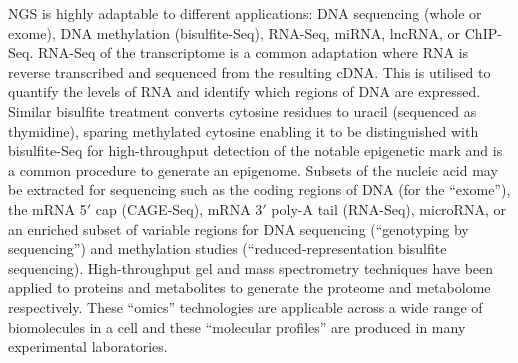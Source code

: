 
\gls{NGS} is highly adaptable to different applications: DNA sequencing (whole  or \gls{exome}), DNA methylation (\gls{bisulfite-Seq}), \gls{RNA-Seq}, \gls{miRNA}, \gls{lncRNA}, or \gls{ChIP-Seq}. \gls{RNA-Seq} of the \gls{transcriptome} is a common adaptation where \gls{RNA} is reverse transcribed and sequenced from the resulting \gls{cDNA}. This is utilised to quantify the levels of \gls{RNA} and identify which regions of DNA are expressed. Similar bisulfite treatment converts cytosine residues to uracil (sequenced as thymidine), sparing methylated cytosine enabling it to be distinguished with bisulfite-Seq for high-throughput detection of the notable epigenetic mark and is a common procedure to generate an \gls{epigenome}. Subsets of the nucleic acid may be extracted for sequencing such as the coding regions of DNA (for the ``\gls{exome}''), the mRNA 5$'$ cap (\gls{CAGE-Seq}), mRNA 3$'$ poly-A tail (\gls{RNA-Seq}), \gls{microRNA}, or an enriched subset of variable regions for DNA sequencing (``genotyping by sequencing'') and methylation studies (``reduced-representation bisulfite sequencing).  High-throughput gel and mass spectrometry techniques have been applied to proteins and metabolites to generate the \gls{proteome} and \gls{metabolome} respectively. These ``\gls{omics}'' technologies are applicable across a wide range of biomolecules in a cell and these ``molecular profiles'' are produced in many experimental laboratories. %

